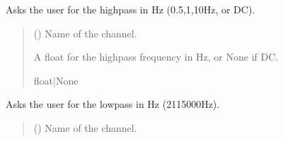 \documentclass[letterpaper,10pt,english]{sphinxmanual}
\begin{document}
\begin{fulllineitems}
\begin{fulllineitems}
\end{fulllineitems}


\begin{fulllineitems}
\label{\detokenize{Setup.SetupOneDevice:Setup.SetupOneDevice.Setup_8401HR.Setup8401HR._SetHighpass}}
\pysigstartsignatures
{}
\pysigstopsignatures
\sphinxAtStartPar
Asks the user for the high\sphinxhyphen{}pass in Hz (0.5,1,10Hz, or DC).
\begin{quote}\begin{description}
\sphinxAtStartPar
{} () \textendash{} Name of the channel.

\sphinxAtStartPar
A float for the high\sphinxhyphen{}pass frequency in Hz, or None if DC.

\sphinxAtStartPar
float|None

\end{description}\end{quote}

\end{fulllineitems}


\begin{fulllineitems}
\label{\detokenize{Setup.SetupOneDevice:Setup.SetupOneDevice.Setup_8401HR.Setup8401HR._SetLowpass}}
\pysigstartsignatures
{}
\pysigstopsignatures
\sphinxAtStartPar
Asks the user for the low\sphinxhyphen{}pass in Hz (21\sphinxhyphen{}15000Hz).
\begin{quote}\begin{description}
\sphinxAtStartPar
{} () \textendash{} Name of the channel.


\end{description}
\end{quote}
\end{fulllineitems}
\end{fulllineitems}
\end{document}
